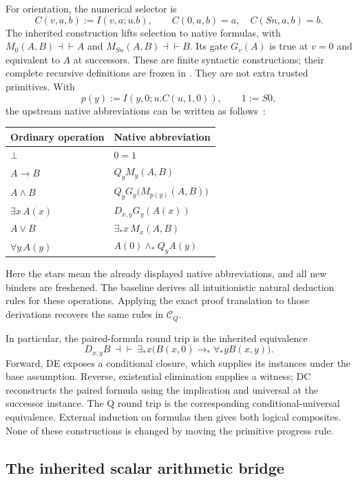 \documentclass[11pt]{article}
\theoremstyle{definition}
\newcommand{\CQ}{\mathcal C_Q}
\begin{document}
For orientation, the numerical selector is
\[
     C(v,a,b):=I(v,a;u.b),\qquad
     C(0,a,b)=a,\quad C(Sn,a,b)=b.
\]
The inherited construction lifts selection to native formulas, with
$M_0(A,B)\dashv\vdash A$ and $M_{Sn}(A,B)\dashv\vdash B$. Its gate
$G_v(A)$ is true at $v=0$ and equivalent to $A$ at successors.
These are finite syntactic constructions; their complete recursive
definitions are frozen in .
They are not extra trusted primitives. With
\[
 p(y):=I(y,0;u.C(u,1,0)),\qquad 1:=S0,
\]
the upstream native abbreviations can be written as follows~\cite{nativelogic}:
\begin{center}
\begin{tabular}{@{}ll@{}}
\toprule
Ordinary operation & Native abbreviation \\
\midrule
$\bot$ & $0=1$ \\
$A\to B$ & $Q_y M_y(A,B)$ \\
$A\wedge B$ & $Q_yG_y\bigl(M_{p(y)}(A,B)\bigr)$ \\
$\exists x\,A(x)$ & $D_{x,y}G_y(A(x))$ \\
$A\vee B$ & $\exists_*x\,M_x(A,B)$ \\
$\forall y\,A(y)$ & $A(0)\wedge_* Q_y A(y)$ \\
\bottomrule
\end{tabular}
\end{center}
Here the stars mean the already displayed native abbreviations, and all
new binders are freshened. The baseline derives all intuitionistic natural
deduction rules for these operations. Applying the exact proof translation
to those derivations recovers the same rules in $\CQ$.

In particular, the paired-formula round trip is the inherited equivalence
\[
 D_{x,y}B\ \dashv\vdash\
 \exists_*x\bigl(B(x,0)\to_*\forall_*y B(x,y)\bigr).
\]
Forward, DE exposes a conditional closure, which supplies its instances
under the base assumption. Reverse, existential elimination supplies a
witness; DC reconstructs the paired formula using the implication and
universal at the successor instance. The Q round trip is the corresponding
conditional-universal equivalence. External induction on formulas then
gives both logical composites. None of these constructions is changed by
moving the primitive progress rule.

\subsection{The inherited scalar arithmetic bridge}
\end{document}
